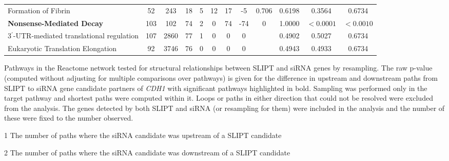 \begin{table*}[!tb]
{{\begin{threeparttable}
\begin{tabular}{l|cc|cc|cccc|cc|c}
\rowcolor{black!10}
Formation of Fibrin                       & 52          & 243          & 18            & 5           & 12   & 17   & -5      & 0.706        & 0.6198             & 0.3564    & 0.6734            \\
\rowcolor{black!5}
\textbf{Nonsense-Mediated Decay}                   & 103         & 102          & 74            & 2           & 0    & 74   & -74     & 0            & 1.0000             & $<0.0001$  & $<0.0010$                \\
\rowcolor{black!10}
3$^\prime$-UTR-mediated translational regulation & 107         & 2860         & 77            & 1           & 0    & 0    & 0       &              & 0.4902             & 0.5027   & 0.6734             \\
\rowcolor{black!5}
Eukaryotic Translation Elongation         & 92          & 3746         & 76            & 0           & 0    & 0    & 0       &              & 0.4943             & 0.4933   & 0.6734             \\
\hline
\end{tabular}
\begin{tablenotes}
\raggedright %
Pathways in the Reactome network tested for structural relationships between \gls{SLIPT} and \gls{siRNA} genes by resampling. The raw p-value (computed without adjusting for multiple comparisons over \glspl{pathway}) is given for the difference in upstream and downstream paths from \gls{SLIPT} to \gls{siRNA} gene candidate partners of \textit{CDH1} with significant \glspl{pathway} highlighted in bold. Sampling was performed only in the target \gls{pathway} and \glspl{shortest path} were computed within it. Loops or paths in either direction that could not be resolved were excluded from the analysis. The genes detected by both \gls{SLIPT} and \gls{siRNA} (or resampling for them) were included in the analysis and the number of these were fixed to the number observed.

\item[1] The number of paths where the \gls{siRNA} candidate was upstream of a \gls{SLIPT} candidate

\item[2] The number of paths where the \gls{siRNA} candidate was downstream of a \gls{SLIPT} candidate
\end{tablenotes}
\end{threeparttable}
}
}
\end{table*}

